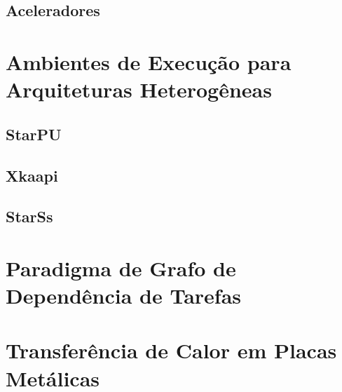 \subsection{Aceleradores}


\section{Ambientes de Execução para Arquiteturas Heterogêneas}
\subsection{StarPU}
\subsection{Xkaapi}
\subsection{StarSs}

\section{Paradigma de Grafo de Dependência de Tarefas}

\section{Transferência de Calor em Placas Metálicas}